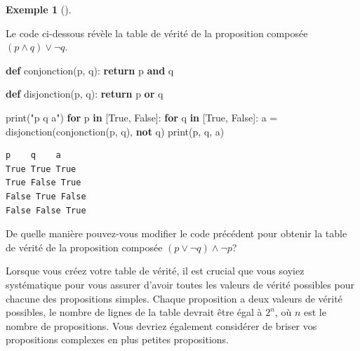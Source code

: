 \documentclass[
  letterpaper,
]{scrbook}
\newenvironment{Shaded}{}{}
\newcommand{\BuiltInTok}[1]{#1}
\newcommand{\ControlFlowTok}[1]{\textcolor[rgb]{0.00,0.44,0.13}{\textbf{#1}}}
\newcommand{\KeywordTok}[1]{\textcolor[rgb]{0.00,0.44,0.13}{\textbf{#1}}}
\newcommand{\NormalTok}[1]{#1}
\newcommand{\OperatorTok}[1]{\textcolor[rgb]{0.40,0.40,0.40}{#1}}
\newcommand{\StringTok}[1]{\textcolor[rgb]{0.25,0.44,0.63}{#1}}
\newcommand{\VariableTok}[1]{\textcolor[rgb]{0.10,0.09,0.49}{#1}}
\theoremstyle{plain}
\theoremstyle{definition}
\newtheorem{example}{Exemple}[chapter]
\theoremstyle{definition}
\theoremstyle{remark}
\begin{document}
\leavevmode{}%
\begin{example}[]\label{exm-proposition-compose}

Le code ci-dessous révèle la table de vérité de la proposition composée
\((p \wedge q) \vee \lnot q\).

\hypertarget{prop-composee-1}{}
\begin{Shaded}
\begin{Highlighting}[]
\KeywordTok{def}\NormalTok{ conjonction(p, q):}
    \ControlFlowTok{return}\NormalTok{ p }\KeywordTok{and}\NormalTok{ q}

\KeywordTok{def}\NormalTok{ disjonction(p, q):}
    \ControlFlowTok{return}\NormalTok{ p }\KeywordTok{or}\NormalTok{ q}

\BuiltInTok{print}\NormalTok{(}\StringTok{"p    q    a"}\NormalTok{)}
\ControlFlowTok{for}\NormalTok{ p }\KeywordTok{in}\NormalTok{ [}\VariableTok{True}\NormalTok{, }\VariableTok{False}\NormalTok{]:}
    \ControlFlowTok{for}\NormalTok{ q }\KeywordTok{in}\NormalTok{ [}\VariableTok{True}\NormalTok{, }\VariableTok{False}\NormalTok{]:}
\NormalTok{        a }\OperatorTok{=}\NormalTok{ disjonction(conjonction(p, q), }\KeywordTok{not}\NormalTok{ q)}
        \BuiltInTok{print}\NormalTok{(p, q, a)}
\end{Highlighting}
\end{Shaded}

\begin{verbatim}
p    q    a
True True True
True False True
False True False
False False True
\end{verbatim}

De quelle manière pouvez-vous modifier le code précédent pour obtenir la
table de vérité de la proposition composée
\((p \vee \lnot q) \wedge \lnot p\)?

\end{example}

Lorsque vous créez votre table de vérité, il est crucial que vous soyiez
systématique pour vous assurer d'avoir toutes les valeurs de vérité
possibles pour chacune des propositions simples. Chaque proposition a
deux valeurs de vérité possibles, le nombre de lignes de la table
devrait être égal à \(2^n\), où \(n\) est le nombre de propositions.
Vous devriez également considérer de briser vos propositions complexes
en plus petites propositions.
\end{document}
